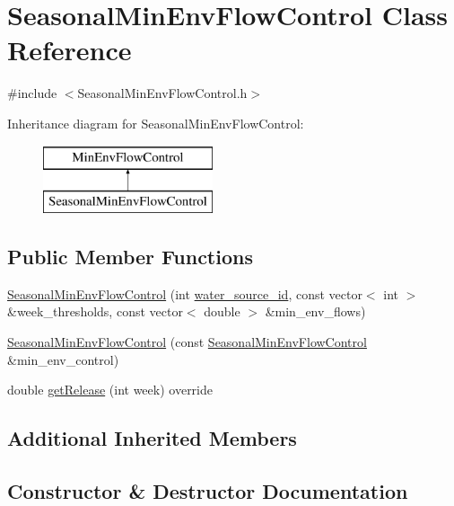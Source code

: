\hypertarget{classSeasonalMinEnvFlowControl}{}\section{Seasonal\+Min\+Env\+Flow\+Control Class Reference}
\label{classSeasonalMinEnvFlowControl}


{\ttfamily \#include $<$Seasonal\+Min\+Env\+Flow\+Control.\+h$>$}

Inheritance diagram for Seasonal\+Min\+Env\+Flow\+Control\+:\begin{figure}[H]
\begin{center}
\leavevmode
\includegraphics[height=2.000000cm]{classSeasonalMinEnvFlowControl}
\end{center}
\end{figure}
\subsection*{Public Member Functions}
\begin{DoxyCompactItemize}
\item 
\mbox{\hyperlink{classSeasonalMinEnvFlowControl_a02ea55181dd200190a6b792e57f30193}{Seasonal\+Min\+Env\+Flow\+Control}} (int \mbox{\hyperlink{classMinEnvFlowControl_aada518a047598f386daec1d0358023aa}{water\+\_\+source\+\_\+id}}, const vector$<$ int $>$ \&week\+\_\+thresholds, const vector$<$ double $>$ \&min\+\_\+env\+\_\+flows)
\item 
\mbox{\hyperlink{classSeasonalMinEnvFlowControl_ad0eeb570fc096a92b788b5c4a48bcec4}{Seasonal\+Min\+Env\+Flow\+Control}} (const \mbox{\hyperlink{classSeasonalMinEnvFlowControl}{Seasonal\+Min\+Env\+Flow\+Control}} \&min\+\_\+env\+\_\+control)
\item 
double \mbox{\hyperlink{classSeasonalMinEnvFlowControl_a5c5ddcab367812bdd2e23b383449d202}{get\+Release}} (int week) override
\end{DoxyCompactItemize}
\subsection*{Additional Inherited Members}


\subsection{Constructor \& Destructor Documentation}
\mbox{\label{classSeasonalMinEnvFlowControl_a02ea55181dd200190a6b792e57f30193}} 
